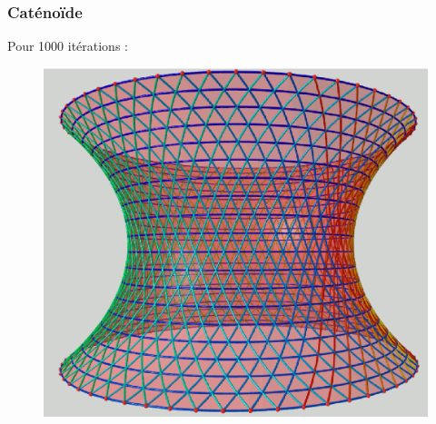 \documentclass{beamer}
\begin{document}
\begin{frame}
\frametitle{Caténoïde}
Pour 1000 itérations : \\
\begin{figure}[h!]
      \centering 
      \includegraphics[scale=0.31]{catenoide/catenoide-9.eps}
\end{figure}
\end{frame}
\end{document}
